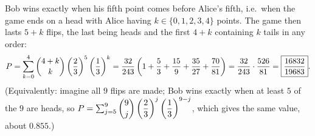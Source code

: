Bob wins exactly when his fifth point comes before Alice's fifth, i.e.\ when the game ends on a head with Alice having $k\in\{0,1,2,3,4\}$ points. The game then lasts $5+k$ flips, the last being heads and the first $4+k$ containing $k$ tails in any order:
\[
P=\sum_{k=0}^{4}\dbinom{4+k}{k}\left(\dfrac{2}{3}\right)^5\left(\dfrac{1}{3}\right)^k=\dfrac{32}{243}\left(1+\dfrac{5}{3}+\dfrac{15}{9}+\dfrac{35}{27}+\dfrac{70}{81}\right)=\dfrac{32}{243}\cdot\dfrac{526}{81}=\boxed{\dfrac{16832}{19683}}.
\]
(Equivalently: imagine all $9$ flips are made; Bob wins exactly when at least $5$ of the $9$ are heads, so $P=\sum_{j=5}^{9}\dbinom9j\left(\dfrac{2}{3}\right)^j\left(\dfrac{1}{3}\right)^{9-j}$, which gives the same value, about $0.855$.)
